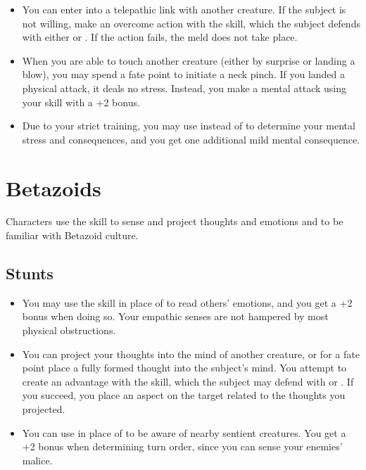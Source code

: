 \documentclass[12pt,titlepage,openany]{book}
\begin{document}
\begin{itemize}
    \item {} You can enter into a telepathic link with another
        creature. If the subject is not willing, make an overcome action with
        the  skill, which the subject defends with either
         or . If the action fails, the meld does not
        take place.

    \item {} When you are able to touch another creature
        (either by surprise or landing a blow), you may spend a fate point to
        initiate a neck pinch. If you landed a physical attack, it deals no
        stress. Instead, you make a mental attack using your 
        skill with a +2 bonus.

    \item {} Due to your strict training, you may use
         instead of  to determine your mental stress
        and consequences, and you get one additional mild mental consequence.
\end{itemize}

\section{Betazoids}\label{sec:betazoids}

Characters use the  skill to sense and project thoughts and
emotions and to be familiar with Betazoid culture.

\subsection*{ Stunts}\label{subsec:betazoid-powers}

\begin{itemize}
    \item {} You may use the  skill in
        place of  to read others' emotions, and you get a +2
        bonus when doing so. Your empathic senses are not hampered by most
        physical obstructions.

    \item {} You can project your thoughts into the
        mind of another creature, or for a fate point place a fully formed
        thought into the subject's mind. You attempt to create an advantage
        with the  skill, which the subject may defend with
         or . If you succeed, you place an aspect
        on the target related to the thoughts you projected.

    \item {} You can use  in place of
         to be aware of nearby sentient creatures. You get a +2
        bonus when determining turn order, since you can sense your enemies'
        malice.
\end{itemize}
\end{document}
